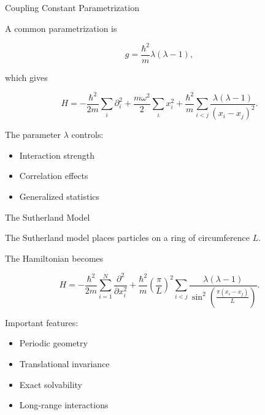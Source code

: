\documentclass{beamer}
\begin{document}
\begin{frame}{Coupling Constant Parametrization}

A common parametrization is

\[
g =
\frac{\hbar^2}{m}
\lambda(\lambda-1),
\]

which gives

\[
H =
-\frac{\hbar^2}{2m}
\sum_i \partial_i^2
+
\frac{m\omega^2}{2}
\sum_i x_i^2
+
\frac{\hbar^2}{m}
\sum_{i<j}
\frac{\lambda(\lambda-1)}
{(x_i-x_j)^2}.
\]

\vspace{0.4cm}

The parameter $\lambda$ controls:
\begin{itemize}
    \item Interaction strength
    \item Correlation effects
    \item Generalized statistics
\end{itemize}

\end{frame}

\begin{frame}{The Sutherland Model}

The Sutherland model places particles on a ring of circumference $L$.

\vspace{0.3cm}

The Hamiltonian becomes

\[
H =
-\frac{\hbar^2}{2m}
\sum_{i=1}^{N}
\frac{\partial^2}{\partial x_i^2}
+
\frac{\hbar^2}{m}
\left(\frac{\pi}{L}\right)^2
\sum_{i<j}
\frac{\lambda(\lambda-1)}
{\sin^2\left(
\frac{\pi(x_i-x_j)}{L}
\right)}.
\]

\vspace{0.3cm}

Important features:
\begin{itemize}
    \item Periodic geometry
    \item Translational invariance
    \item Exact solvability
    \item Long-range interactions
\end{itemize}

\end{frame}
\end{document}
